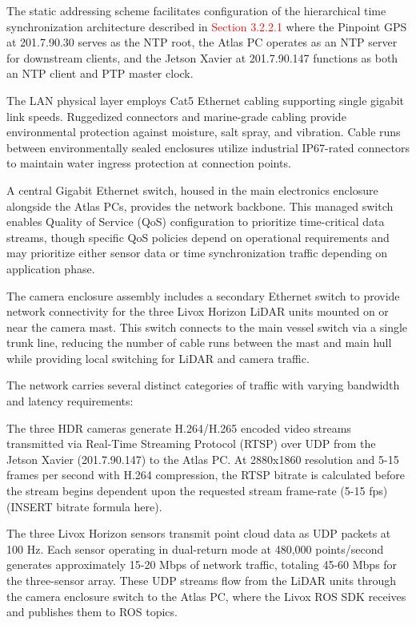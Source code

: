 \documentclass{erauthesis}
\begin{document}
The static addressing scheme facilitates configuration of the hierarchical time synchronization architecture described in \textcolor{red}{Section 3.2.2.1}
where the Pinpoint GPS at 201.7.90.30 serves as the NTP root, the Atlas PC operates as an NTP server for downstream clients, and the Jetson Xavier at 201.7.90.147 functions as both an NTP client and PTP master clock.


The LAN physical layer employs Cat5 Ethernet cabling supporting single gigabit link speeds. Ruggedized connectors and marine-grade cabling provide environmental protection against moisture, salt spray, and vibration. Cable runs between environmentally sealed enclosures utilize industrial IP67-rated connectors to maintain water ingress protection at connection points.

A central Gigabit Ethernet switch, housed in the main electronics enclosure alongside the Atlas PCs, provides the network backbone. This managed switch enables Quality of Service (QoS) configuration to prioritize time-critical data streams, though specific QoS policies depend on operational requirements and may prioritize either sensor data or time synchronization traffic depending on application phase.

The camera enclosure assembly includes a secondary Ethernet switch to provide network connectivity for the three Livox Horizon LiDAR units mounted on or near the camera mast. This switch connects to the main vessel switch via a single trunk line, reducing the number of cable runs between the mast and main hull while providing local switching for LiDAR and camera traffic.


The network carries several distinct categories of traffic with varying bandwidth and latency requirements:

The three HDR cameras generate H.264/H.265 encoded video streams transmitted via Real-Time Streaming Protocol (RTSP) over UDP from the Jetson Xavier (201.7.90.147) to the Atlas PC. At 2880x1860 resolution and 5-15 frames per second with H.264 compression, the RTSP bitrate is calculated before the stream begins dependent upon the requested stream frame-rate (5-15 fps) (INSERT bitrate formula here).

The three Livox Horizon sensors transmit point cloud data as UDP packets at 100 Hz. Each sensor operating in dual-return mode at 480,000 points/second generates approximately 15-20 Mbps of network traffic, totaling 45-60 Mbps for the three-sensor array. These UDP streams flow from the LiDAR units through the camera enclosure switch to the Atlas PC, where the Livox ROS SDK receives and publishes them to ROS topics.
\end{document}
